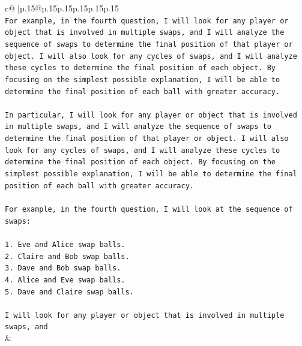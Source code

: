 \documentclass{article}
\begin{document}
{\begin{supertabular}{c@{$\;$}|p{.15\linewidth}@{}p{.15\linewidth}p{.15\linewidth}p{.15\linewidth}p{.15\linewidth}p{.15\linewidth}}
{{{\\ 
\texttt{For example, in the fourth question, I will look for any player or object that is involved in multiple swaps, and I will analyze the sequence of swaps to determine the final position of that player or object. I will also look for any cycles of swaps, and I will analyze these cycles to determine the final position of each object. By focusing on the simplest possible explanation, I will be able to determine the final position of each ball with greater accuracy.} \\
\\ 
\texttt{In particular, I will look for any player or object that is involved in multiple swaps, and I will analyze the sequence of swaps to determine the final position of that player or object. I will also look for any cycles of swaps, and I will analyze these cycles to determine the final position of each object. By focusing on the simplest possible explanation, I will be able to determine the final position of each ball with greater accuracy.} \\
\\ 
\texttt{For example, in the fourth question, I will look at the sequence of swaps:} \\
\\ 
\texttt{1. Eve and Alice swap balls.} \\
\texttt{2. Claire and Bob swap balls.} \\
\texttt{3. Dave and Bob swap balls.} \\
\texttt{4. Alice and Eve swap balls.} \\
\texttt{5. Dave and Claire swap balls.} \\
\\ 
\texttt{I will look for any player or object that is involved in multiple swaps, and} \\
            }
        }
    }
    & \\ \\

\end{supertabular}
}
\end{document}
